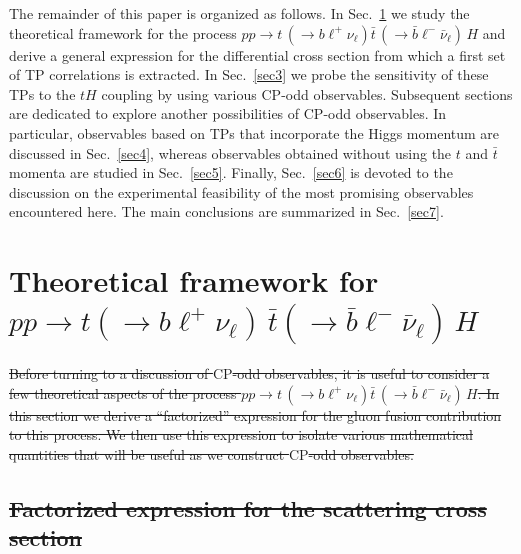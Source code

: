 \documentclass[aps,preprint,tightenlines,floatfix,superscriptaddress,nofootinbib,showpacs]{revtex4-1}
\def\tbar{\bar{t}}
\def\bbar{\bar{b}}
\def\nubar{{\bar{\nu}}_{\ell}}
\def\ppprocess{pp\to t\,\left(\rightarrow b {\ell}^+ \nu_{\ell}\right) \tbar\,\left(\rightarrow\bbar {\ell}^-\nubar\right)\,H}
\providecommand{\DIFdel}[1]{{\protect\color{red}\sout{#1}}}                      %
\providecommand{\DIFdelbegin}{} %
\providecommand{\DIFdelend}{} %
\begin{document}
The remainder of this paper is organized as follows. In
Sec.~\ref{sec2} we study the theoretical framework for the process
$\ppprocess$ and derive a general expression for the differential
cross section from which a first set of TP correlations is
extracted. In Sec.~\ref{sec3} we probe the sensitivity of these TPs to
the $tH$ coupling by using various $\mathrm{CP}$-odd
observables. Subsequent sections are dedicated to explore another
possibilities of $\mathrm{CP}$-odd observables. In particular,
observables based on TPs that incorporate the Higgs momentum are
discussed in Sec.~\ref{sec4}, whereas observables obtained without
using the $t$ and $\tbar$ momenta are studied in
Sec.~\ref{sec5}. Finally, Sec.~\ref{sec6} is devoted to the discussion
on the experimental feasibility of the most promising observables
encountered here. The main conclusions are summarized in
Sec.~\ref{sec7}.

\setlength{\abovedisplayskip}{10.6pt}
\setlength{\belowdisplayskip}{10.6pt}
\section{Theoretical framework for \MakeLowercase{{\boldmath $pp\to t(\to b {\ell}^+ \nu_{\ell})\,\bar{t}(\to\bar{b} {\ell}^-\bar{\nu}_{\ell})$}}$\,H$}
\label{sec2}

%
\DIFdelbegin \DIFdel{Before turning to a discussion of $\mathrm{CP}$-odd observables,
it is useful to consider a few theoretical aspects of
the process $\ppprocess$.  In this section we derive a ``factorized''
expression for the gluon fusion contribution to this process.
We then use this expression to isolate various mathematical quantities
that will be useful as we construct $\mathrm{CP}$-odd observables.
}\DIFdelend 

\DIFdelbegin \subsection{\DIFdel{Factorized expression for the scattering cross section}}
\addtocounter{subsection}{-1}%
\end{document}
